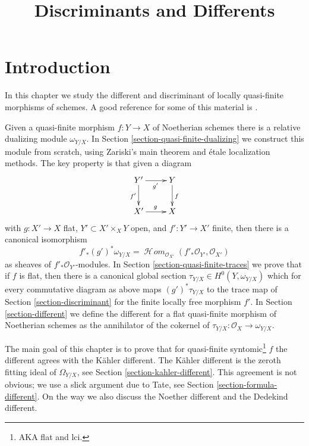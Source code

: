 \documentclass{stacks-project}
\theoremstyle{plain}
\theoremstyle{definition}
\theoremstyle{remark}
\numberwithin{equation}{subsection}
\def\SheafHom{\mathop{\mathcal{H}\!\mathit{om}}\nolimits}
\begin{document}
\title{Discriminants and Differents}


\maketitle

\label{section-phantom}

\tableofcontents

\section{Introduction}
\label{section-introduction}

\noindent
In this chapter we study the different and discriminant
of locally quasi-finite morphisms of schemes.
A good reference for some of this material is \cite{Kunz}.

\medskip\noindent
Given a quasi-finite morphism $f : Y \to X$ of Noetherian schemes
there is a relative dualizing module $\omega_{Y/X}$. 
In Section \ref{section-quasi-finite-dualizing}
we construct this module from scratch, using
Zariski's main theorem and \'etale localization methods.
The key property is that given a diagram
$$
\xymatrix{
Y' \ar[d]_{f'} \ar[r]_{g'} & Y \ar[d]^f \\
X' \ar[r]^g & X
}
$$
with $g : X' \to X$ flat, $Y' \subset X' \times_X Y$ open, and
$f' : Y' \to X'$ finite, then there is a canonical isomorphism
$$
f'_*(g')^*\omega_{Y/X} =
\SheafHom_{\mathcal{O}_{X'}}(f'_*\mathcal{O}_{Y'}, \mathcal{O}_{X'})
$$
as sheaves of $f'_*\mathcal{O}_{Y'}$-modules. In
Section \ref{section-quasi-finite-traces} we prove that
if $f$ is flat, then there is a canonical global section
$\tau_{Y/X} \in H^0(Y, \omega_{Y/X})$ which for every commutative
diagram as above maps $(g')^*\tau_{Y/X}$ to the trace map
of Section \ref{section-discriminant}
for the finite locally free morphism $f'$.
In Section \ref{section-different}
we define the different for a flat quasi-finite
morphism of Noetherian schemes as the annihilator of the
cokernel of $\tau_{Y/X} : \mathcal{O}_X \to \omega_{Y/X}$.

\medskip\noindent
The main goal of this chapter is to prove that for
quasi-finite syntomic\footnote{AKA flat and lci.} $f$ the
different agrees with the K\"ahler different.
The K\"ahler different is the zeroth fitting ideal of $\Omega_{Y/X}$, see
Section \ref{section-kahler-different}.
This agreement is not obvious; we use a slick argument
due to Tate, see Section \ref{section-formula-different}.
On the way we also discuss the Noether different
and the Dedekind different.
\end{document}
